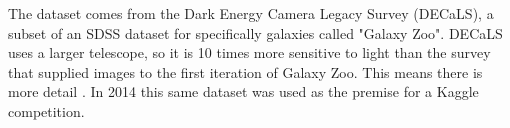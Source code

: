 The dataset comes from the Dark Energy Camera Legacy Survey (DECaLS), a subset of an SDSS dataset for specifically galaxies called "Galaxy Zoo". DECaLS uses a larger telescope, so it is 10 times more sensitive to light than the survey that supplied images to the first iteration of Galaxy Zoo. This means there is more detail \cite{zooniverse}. In 2014 this same dataset was used as the premise for a Kaggle competition.

